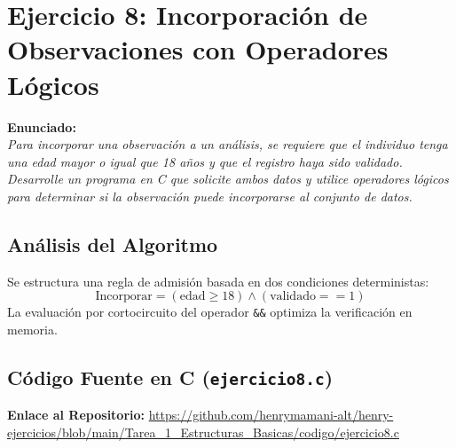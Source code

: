 \documentclass[12pt]{article}
\begin{document}
\section*{Ejercicio 8: Incorporación de Observaciones con Operadores Lógicos}

\noindent\textbf{Enunciado:}\\
\textit{Para incorporar una observación a un análisis, se requiere que el individuo tenga una edad mayor o igual que 18 años y que el registro haya sido validado. Desarrolle un programa en C que solicite ambos datos y utilice operadores lógicos para determinar si la observación puede incorporarse al conjunto de datos.}

\subsection*{Análisis del Algoritmo}
Se estructura una regla de admisión basada en dos condiciones deterministas:
\[ \text{Incorporar} = (\text{edad} \ge 18) \land (\text{validado} == 1) \]
La evaluación por cortocircuito del operador \texttt{\&\&} optimiza la verificación en memoria.

\subsection*{Código Fuente en C (\texttt{ejercicio8.c})}
\noindent\textbf{Enlace al Repositorio:} \url{https://github.com/henrymamani-alt/henry-ejercicios/blob/main/Tarea_1_Estructuras_Basicas/codigo/ejercicio8.c}
\end{document}
